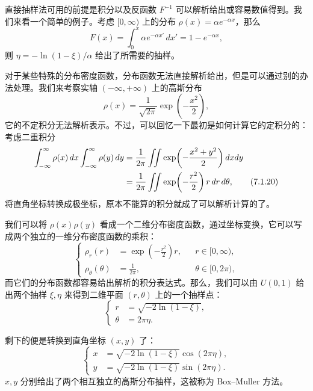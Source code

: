 直接抽样法可用的前提是积分以及反函数 $F^{-1}$ 可以解析给出或容易数值得到。我们来看一个简单的例子。考虑 $[0,\infty)$ 上的分布 $\rho(x)=\alpha e^{-\alpha x}$，那么
\begin{equation}
 F(x)=\int_0^x\alpha e^{-\alpha x'}\,dx'=1-e^{-\alpha x},
\tag{7.1.18}
\end{equation}
则 $\eta=-\ln(1-\xi)/\alpha$ 给出了所需要的抽样。

对于某些特殊的分布密度函数，分布函数无法直接解析给出，但是可以通过别的办法处理。我们来考察实轴 $(-\infty,+\infty)$ 上的高斯分布
\begin{equation}
 \rho(x)=\frac1{\sqrt{2\pi}}\exp\!\left(-\frac{x^2}{2}\right),
\tag{7.1.19}
\end{equation}
它的不定积分无法解析表示。不过，可以回忆一下最初是如何计算它的定积分的：考虑二重积分
\begin{align}
 \int_{-\infty}^{\infty}\rho(x)\,dx\int_{-\infty}^{\infty}\rho(y)\,dy
 &=\frac1{2\pi}\iint\exp\!\left(-\frac{x^2+y^2}{2}\right)dxdy\notag\\
 &=\frac1{2\pi}\iint\exp\!\left(-\frac{r^2}{2}\right)r\,dr\,d\theta,
\tag{7.1.20}
\end{align}
将直角坐标转换成极坐标，原本不能算的积分就成了可以解析计算的了。

我们可以将 $\rho(x)\rho(y)$ 看成一个二维分布密度函数，通过坐标变换，它可以写成两个独立的一维分布密度函数的乘积：
\begin{equation}
 \left\{
 \begin{aligned}
 \rho_r(r)&=\exp\!\left(-\frac{r^2}{2}\right)r,&&r\in[0,\infty),\\
 \rho_\theta(\theta)&=\frac1{2\pi},&&\theta\in[0,2\pi),
 \end{aligned}
 \right.
\tag{7.1.21}
\end{equation}
而它们的分布函数都容易给出解析的积分表达式。那么，我们可以由 $U(0,1)$ 给出两个抽样 $\xi,\eta$ 来得到二维平面 $(r,\theta)$ 上的一个抽样点：
\begin{equation}
 \left\{
 \begin{aligned}
 r&=\sqrt{-2\ln(1-\xi)},\\
 \theta&=2\pi\eta.
 \end{aligned}
 \right.
\tag{7.1.22}
\end{equation}

剩下的便是转换到直角坐标 $(x,y)$ 了：
\begin{equation}
 \left\{
 \begin{aligned}
 x&=\sqrt{-2\ln(1-\xi)}\cos(2\pi\eta),\\
 y&=\sqrt{-2\ln(1-\xi)}\sin(2\pi\eta).
 \end{aligned}
 \right.
\tag{7.1.23}
\end{equation}
$x,y$ 分别给出了两个相互独立的高斯分布抽样，这被称为 Box--Muller 方法。

